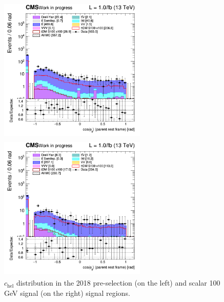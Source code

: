 \documentclass[a4paper, 10pt, openright]{report}
\begin{document}
\begin{itemize}
\begin{figure}[htbp]
\centering
\begin{minipage}[b]{.48\textwidth}
\includegraphics[width=7cm, height=7cm]{figs/2018/SRBlinded-ttDM-scalar100/log_cratio_topCR_ll_cosphill.png}
\end{minipage}\hfill
\begin{minipage}[b]{.48\textwidth}
\includegraphics[width=7cm, height=7cm]{figs/2018/SRBlinded-ttDM-scalar100/log_cratio_topCR_ll_BDT_ttDM100_cosphill.png}
\end{minipage} \hfill
\caption{$c_{\text{hel}}$ distribution in the 2018 pre-selection (on the left) and scalar 100 GeV signal (on the right) signal regions.}
\label{fig:SRdisc3bis}
\end{figure}


\end{itemize}
\end{document}
